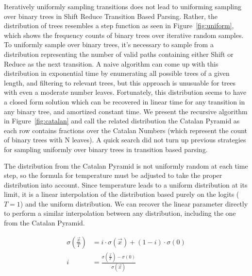 \documentclass[11pt,a4paper]{article}
\begin{document}
Iteratively uniformly sampling transitions does not lead to uniforming sampling over binary trees in Shift Reduce Transition Based Parsing. Rather, the distribution of trees resembles a step function as seen in Figure~\ref{fig:uniform}, which shows the frequency counts of binary trees over iterative random samples. To uniformly sample over binary trees, it's necessary to sample from a distribution representing the number of valid paths containing either Shift or Reduce as the next transition. A naive algorithm can come up with this distribution in exponential time by enumerating all possible trees of a given length, and filtering to relevant trees, but this approach is unusuable for trees with even a moderate number leaves. Fortunately, this distribution seems to have a closed form solution which can be recovered in linear time for any transition in any binary tree, and amortized constant time. We present the recursive algorithm in Figure~\ref{fig:catalan} and call the related distribution the Catalan Pyramid as each row contains fractions over the Catalan Numbers (which represent the count of binary trees with N leaves). A quick search did not turn up previous strategies for sampling uniformly over binary trees in transition based parsing.

The distribution from the Catalan Pyramid is not uniformly random at each time step, so the formula for temperature must be adjusted to take the proper distribution into account. Since temperature leads to a uniform distribution at its limit, it is a linear interpolation of the distribution based purely on the logits ($T = 1$) and the uniform distribution. We can recover the linear parameter directly to perform a similar interpolation between any distribution, including the one from the Catalan Pyramid.

\begin{align}
\sigma(\frac{\vec{x}}{T}) &= i \cdot \sigma(\vec{x}) + (1 - i) \cdot \sigma(0) \\
i &= \frac{\sigma(\frac{\vec{x}}{T}) - \sigma(0)}{\sigma(\vec{x})}
\end{align}
\end{document}
